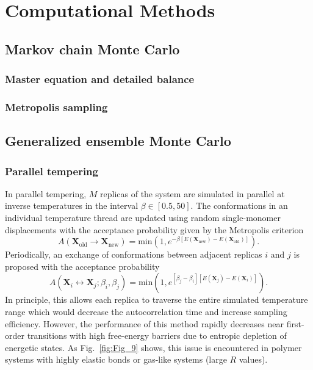 \documentclass[12pt]{report}
\begin{document}
\chapter{Computational Methods}
\section{Markov chain Monte Carlo}
\subsection{Master equation and detailed balance}
\subsection{Metropolis sampling}
\section{Generalized ensemble Monte Carlo}

\subsection{Parallel tempering}
In parallel tempering, $M$ replicas of the system are simulated in parallel
at inverse temperatures in the interval 
$\beta \in \left[0.5,50\right]$. The conformations in an individual
temperature thread are updated using random single-monomer displacements
with the acceptance probability given by the Metropolis criterion
\begin{equation}
A\left(\mathbf{X}_{\mathrm{old}} \rightarrow
\mathbf{X}_{\mathrm{new}}\right) = 			
\mathrm{min}\left(1,e^{ -\beta\left[E (\mathbf{X}_{\mathrm{new}}) - 	
E(\mathbf{X}_{\mathrm{old}})\right]} \right).
\end{equation}
Periodically, an exchange of conformations between adjacent replicas $i$
and $j$ is proposed with the acceptance probability
\begin{equation}
A\left(\mathbf{X}_{i} \leftrightarrow \mathbf{X}_{j};
\beta _{i}, \beta_{j} \right) = \mathrm{min}\left(1,e^{\left[\beta_{j} -
\beta _{i} \right] \left[E (\mathbf{X}_{j}) -
E(\mathbf{X}_{i})\right]} \right).
\end{equation}
In principle, this allows each replica to traverse the entire simulated
temperature range which would decrease the autocorrelation time
and increase sampling efficiency. However, the performance of this method
rapidly decreases near first-order transitions with high free-energy
barriers due to entropic depletion of energetic states. As
Fig.~\ref{fig:Fig_9} shows, this issue is encountered in polymer systems
with highly elastic bonds or gas-like systems (large $R$ values).
\end{document}
